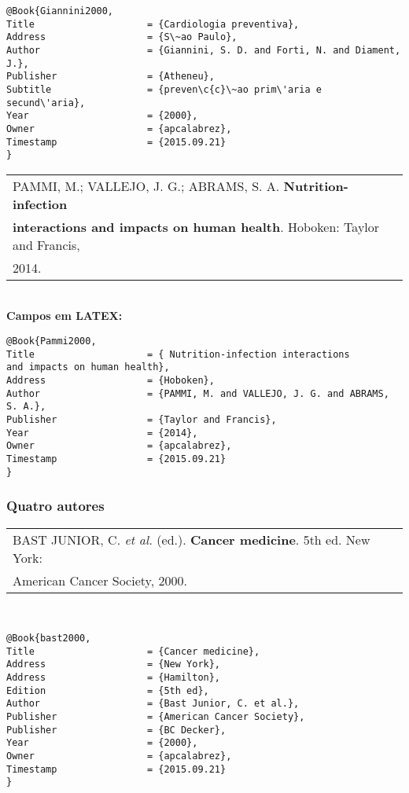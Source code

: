 \begin{verbatim}
@Book{Giannini2000,
Title                    = {Cardiologia preventiva},
Address                  = {S\~ao Paulo},
Author                   = {Giannini, S. D. and Forti, N. and Diament, 
J.},
Publisher                = {Atheneu},
Subtitle                 = {preven\c{c}\~ao prim\'aria e secund\'aria},
Year                     = {2000},
Owner                    = {apcalabrez},
Timestamp                = {2015.09.21}
}
\end{verbatim}

\begin{tabular}{|l|c|} \hline
PAMMI, M.; VALLEJO, J. G.; ABRAMS, S. A. \textbf{Nutrition-infection} \\ \textbf{interactions and impacts on human health}. Hoboken: Taylor and Francis, \\ 2014. \\\hline
\end{tabular}\\

\textbf{Campos em LATEX:}

\begin{verbatim}
@Book{Pammi2000,
Title                    = { Nutrition-infection interactions
and impacts on human health},
Address                  = {Hoboken},
Author                   = {PAMMI, M. and VALLEJO, J. G. and ABRAMS, 
S. A.},
Publisher                = {Taylor and Francis},
Year                     = {2014},
Owner                    = {apcalabrez},
Timestamp                = {2015.09.21}
}
\end{verbatim}

\subsubsection{Quatro autores}

\begin{tabular}{|l|c|} \hline
BAST JUNIOR, C. \textit{et al.} (ed.). \textbf{Cancer medicine}. 
5th ed.	New York: \\ American Cancer Society, 2000. 
\\\hline
\end{tabular}\\

\begin{verbatim}
@Book{bast2000,
Title                    = {Cancer medicine},
Address                  = {New York},
Address                  = {Hamilton},
Edition                  = {5th ed},
Author                   = {Bast Junior, C. et al.},
Publisher                = {American Cancer Society},
Publisher                = {BC Decker},
Year                     = {2000},
Owner                    = {apcalabrez},
Timestamp                = {2015.09.21}
}
\end{verbatim}

